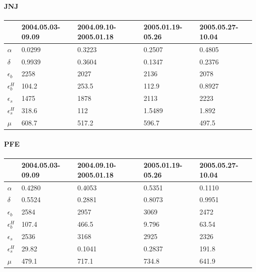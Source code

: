 \documentclass[]{article}
\begin{document}
\paragraph{JNJ}

\begin{center}
	\begin{tabular}{| l | l | l | l |l |}
		\hline
		& 2004.05.03-09.09 & 2004.09.10-2005.01.18 & 2005.01.19-05.26 & 2005.05.27-10.04 \\ \hline
		$\alpha$ 	& 0.0299 	& 0.3223 	& 0.2507&0.4805\\ \hline
		$\delta$ 	& 0.9939	& 0.3604	& 0.1347&0.2376\\ \hline
		$\epsilon_b$ & 2258 	& 2027		& 2136 	&2078 \\ \hline
		$\epsilon_b^H$ & 104.2 	& 253.5		& 112.9 &0.8927 \\ \hline
		$\epsilon_s$ & 1475 	& 1878 		& 2113 &2223 \\ \hline
		$\epsilon_s^H$ & 318.6 	& 112	 	& 1.5489 	&1.892 \\ \hline
		$\mu$ 			&608.7 	& 517.2		& 596.7 & 497.5\\ \hline
	\end{tabular}
\end{center}

\paragraph{PFE}

\begin{center}
	\begin{tabular}{| l | l | l | l |l |}
		\hline
		& 2004.05.03-09.09 & 2004.09.10-2005.01.18 & 2005.01.19-05.26 & 2005.05.27-10.04 \\ \hline
		$\alpha$ 	& 0.4280 	& 0.4053 	& 0.5351 	&0.1110\\ \hline
		$\delta$ 	& 0.5524	& 0.2881 	& 0.8073	&0.9951\\ \hline
		$\epsilon_b$ & 2584		& 2957 		& 3069 		&2472 \\ \hline
		$\epsilon_b^H$ & 107.4	& 466.5 	& 9.796 	&63.54 \\ \hline
		$\epsilon_s$ & 2536 	& 3168 		& 2925  	&2326 \\ \hline
		$\epsilon_s^H$ & 29.82  & 0.1041 	& 0.2837	&191.8 \\ \hline
		$\mu$ 			&479.1  & 717.1		& 734.8 	&641.9\\ \hline
	\end{tabular}
\end{center}
\end{document}
